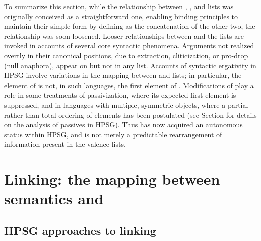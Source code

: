 \documentclass[output=paper
                ,modfonts
                ,nonflat
	        ,collection
	        ,collectionchapter
	        ,collectiontoclongg
 	        ,biblatex
                ,babelshorthands
                ,newtxmath
                ,draftmode
                ,colorlinks, citecolor=brown
]{./langsci/langscibook}
\begin{document}
To summarize this section, while the relationship between \argst, \subj, and \comps lists was originally conceived as a straightforward one, enabling binding principles to maintain their simple form by defining \argst as the concatenation of the other two, the relationship was soon loosened.
Looser
relationships between \argst and the \val lists are invoked in accounts of several core syntactic phenomena.
Arguments not realized overtly in their canonical positions, 
due to extraction, cliticization, or pro-drop (null anaphora), appear on \argst but not in any \val list.  
Accounts of syntactic ergativity in HPSG involve variations in the mapping between \argst and \val lists; in particular, the element of \subj is not, in such languages, the first element of \argst.  
Modifications of \argst play a role in some treatments of passivization, where its expected first element is suppressed, and in languages with multiple, symmetric objects, where a partial rather than total ordering of \argst elements has been postulated (see Section  \label{passives} for details on the analysis of passives in HPSG).
Thus \argst has now acquired an autonomous %
status within HPSG, and is not merely a predictable rearrangement of information present in the valence lists.  


\section{Linking: the mapping between semantics and \argst}
\label{linking-sec}

\subsection{HPSG approaches to linking}
\end{document}
